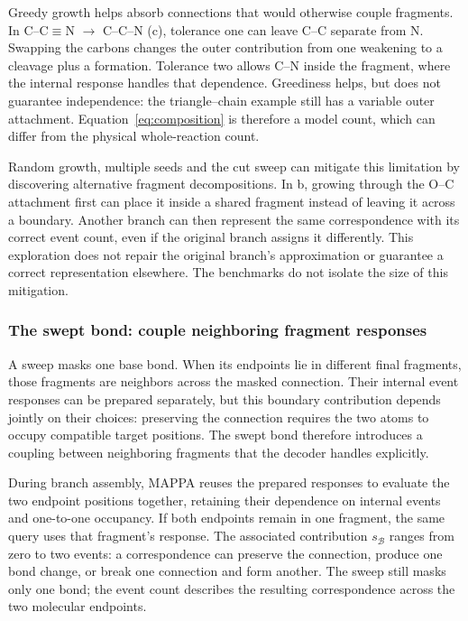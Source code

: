Greedy growth helps absorb connections that would otherwise couple fragments. In C--C$\equiv$N $\rightarrow$ C--C--N (c), tolerance one can leave C--C separate from N. Swapping the carbons changes the outer contribution from one weakening to a cleavage plus a formation. Tolerance two allows C--N inside the fragment, where the internal response handles that dependence. Greediness helps, but does not guarantee independence: the triangle--chain example still has a variable outer attachment. Equation~\eqref{eq:composition} is therefore a model count, which can differ from the physical whole-reaction count.

Random growth, multiple seeds and the cut sweep can mitigate this limitation by discovering alternative fragment decompositions. In b, growing through the O--C attachment first can place it inside a shared fragment instead of leaving it across a boundary. Another branch can then represent the same correspondence with its correct event count, even if the original branch assigns it differently. This exploration does not repair the original branch's approximation or guarantee a correct representation elsewhere. The benchmarks do not isolate the size of this mitigation.

\subsubsection{The swept bond: couple neighboring fragment responses}

A sweep masks one base bond. When its endpoints lie in different final fragments, those fragments are neighbors across the masked connection. Their internal event responses can be prepared separately, but this boundary contribution depends jointly on their choices: preserving the connection requires the two atoms to occupy compatible target positions. The swept bond therefore introduces a coupling between neighboring fragments that the decoder handles explicitly.

During branch assembly, MAPPA reuses the prepared responses to evaluate the two endpoint positions together, retaining their dependence on internal events and one-to-one occupancy. If both endpoints remain in one fragment, the same query uses that fragment's response. The associated contribution $s_{\mathcal B}$ ranges from zero to two events: a correspondence can preserve the connection, produce one bond change, or break one connection and form another. The sweep still masks only one bond; the event count describes the resulting correspondence across the two molecular endpoints.

